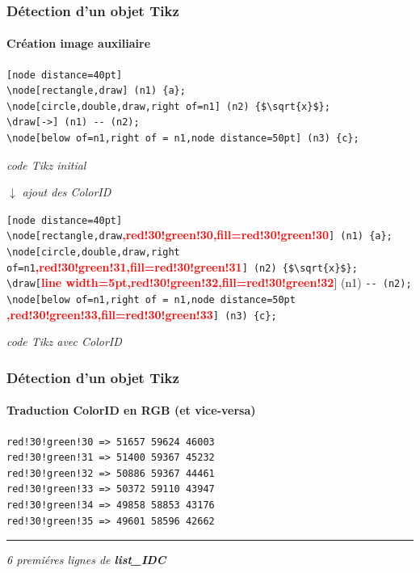 \documentclass{beamer}
\begin{document}
\begin{frame}[containsverbatim]
\frametitle{Détection d'un objet Tikz} 
\framesubtitle{Création image auxiliaire}
\begin{small}
\begin{verbatim}
[node distance=40pt]
\node[rectangle,draw] (n1) {a};
\node[circle,double,draw,right of=n1] (n2) {$\sqrt{x}$};
\draw[->] (n1) -- (n2);
\node[below of=n1,right of = n1,node distance=50pt] (n3) {c};
\end{verbatim}
\begin{flushright}
{\small \textit{code Tikz initial}}
\end{flushright}
\begin{center}
{\normalsize $\downarrow$ \textit{ajout des ColorID}}\\
\end{center}
\verb?[node distance=40pt]?\\
\verb?\node[rectangle,draw?\textcolor{red}{\textbf{,red!30!green!30,fill=red!30!green!30}}\verb?] (n1) {a};?\\
\verb?\node[circle,double,draw,right of=n1?\textcolor{red}{\textbf{,red!30!green!31,fill=red!30!green!31}}\verb?] (n2) {$\sqrt{x}$};?\\
\verb?\draw[?\textcolor{red}{\textbf{line width=5pt,red!30!green!32,fill=red!30!green!32}}] (n1) \verb?-- (n2);?
\verb?\node[below of=n1,right of = n1,node distance=50pt?\\\textcolor{red}{\textbf{,red!30!green!33,fill=red!30!green!33}}\verb?] (n3) {c};?\\
\begin{flushright}
{\small \textit{code Tikz avec ColorID}}
\end{flushright}
\end{small}
\end{frame}

\begin{frame}[containsverbatim]
\frametitle{Détection d'un objet Tikz} 
\framesubtitle{Traduction ColorID en RGB (et vice-versa)}
\begin{verbatim}
red!30!green!30 => 51657 59624 46003
red!30!green!31 => 51400 59367 45232
red!30!green!32 => 50886 59367 44461
red!30!green!33 => 50372 59110 43947
red!30!green!34 => 49858 58853 43176
red!30!green!35 => 49601 58596 42662
\end{verbatim}
\hrule
\begin{flushright}
\textit{6 premiéres lignes de \textbf{list\_IDC}}
\end{flushright}
\end{frame}
\end{document}
